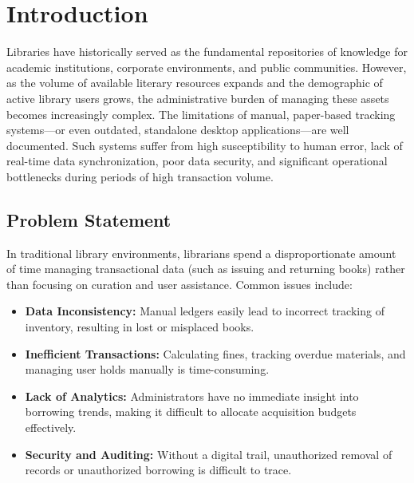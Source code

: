 \documentclass[conference]{IEEEtran}
\begin{document}
\section{Introduction}
Libraries have historically served as the fundamental repositories of knowledge for academic institutions, corporate environments, and public communities. However, as the volume of available literary resources expands and the demographic of active library users grows, the administrative burden of managing these assets becomes increasingly complex. The limitations of manual, paper-based tracking systems—or even outdated, standalone desktop applications—are well documented. Such systems suffer from high susceptibility to human error, lack of real-time data synchronization, poor data security, and significant operational bottlenecks during periods of high transaction volume.

\subsection{Problem Statement}
In traditional library environments, librarians spend a disproportionate amount of time managing transactional data (such as issuing and returning books) rather than focusing on curation and user assistance. Common issues include:
\begin{itemize}
    \item \textbf{Data Inconsistency:} Manual ledgers easily lead to incorrect tracking of inventory, resulting in lost or misplaced books.
    \item \textbf{Inefficient Transactions:} Calculating fines, tracking overdue materials, and managing user holds manually is time-consuming.
    \item \textbf{Lack of Analytics:} Administrators have no immediate insight into borrowing trends, making it difficult to allocate acquisition budgets effectively.
    \item \textbf{Security and Auditing:} Without a digital trail, unauthorized removal of records or unauthorized borrowing is difficult to trace.
\end{itemize}
\end{document}
